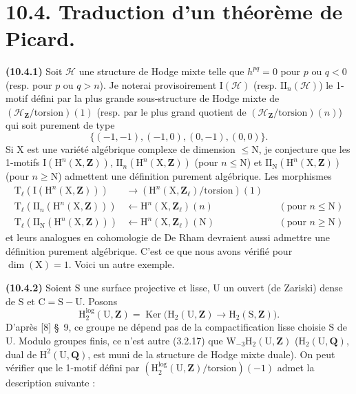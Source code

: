 \documentclass[11pt,leqno]{article}
\newcommand{\Page}[1]{\ifvmode\noindent\else\unskip\ \fi{\footnotesize\textcolor{gray}{[p.\,#1]}}\ \ignorespaces}
\begin{document}
\Page{75}
\section*{10.4. Traduction d’un théorème de Picard.}

\textbf{(10.4.1)} Soit \(\mathcal{H}\) une structure de Hodge mixte telle que \(h^{pq}=0\) pour \(p\) ou \(q<0\) (resp. pour \(p\) ou \(q>n\)). Je noterai provisoirement \(\mathrm{I}(\mathcal{H})\) (resp. \(\mathrm{II}_n(\mathcal{H})\)) le 1-motif défini par la plus grande sous-structure de Hodge mixte de \((\mathcal{H}_{\mathbf{Z}}/\mathrm{torsion})(1)\) (resp. par le plus grand quotient de \((\mathcal{H}_{\mathbf{Z}}/\mathrm{torsion})(n)\)) qui soit purement de type
\[
\{(-1,-1),(-1,0),(0,-1),(0,0)\}.
\]
Si \(\mathrm{X}\) est une variété algébrique complexe de dimension \(\leq\mathrm{N}\), je conjecture que les 1-motifs \(\mathrm{I}(\mathrm{H}^{n}(\mathrm{X},\mathbf{Z}))\), \(\mathrm{II}_n(\mathrm{H}^{n}(\mathrm{X},\mathbf{Z}))\) (pour \(n\leq\mathrm{N}\)) et \(\mathrm{II}_{\mathrm{N}}(\mathrm{H}^{n}(\mathrm{X},\mathbf{Z}))\) (pour \(n\geq\mathrm{N}\)) admettent une définition purement algébrique. Les morphismes
\[
\begin{aligned}
\mathrm{T}_{\ell}(\mathrm{I}(\mathrm{H}^{n}(\mathrm{X},\mathbf{Z})))
 &\longrightarrow
 (\mathrm{H}^{n}(\mathrm{X},\mathbf{Z}_{\ell})/\mathrm{torsion})(1)\\
\mathrm{T}_{\ell}(\mathrm{II}_n(\mathrm{H}^{n}(\mathrm{X},\mathbf{Z})))
 &\longleftarrow
 \mathrm{H}^{n}(\mathrm{X},\mathbf{Z}_{\ell})(n)
 &&(\text{pour }n\leq\mathrm{N})\\
\mathrm{T}_{\ell}(\mathrm{II}_{\mathrm{N}}(\mathrm{H}^{n}(\mathrm{X},\mathbf{Z})))
 &\longleftarrow
 \mathrm{H}^{n}(\mathrm{X},\mathbf{Z}_{\ell})(\mathrm{N})
 &&(\text{pour }n\geq\mathrm{N})
\end{aligned}
\]
et leurs analogues en cohomologie de De Rham devraient aussi admettre une définition purement algébrique. C’est ce que nous avons vérifié pour \(\dim(\mathrm{X})=1\). Voici un autre exemple.

\textbf{(10.4.2)} Soient \(\mathrm{S}\) une surface projective et lisse, \(\mathrm{U}\) un ouvert (de Zariski) dense de \(\mathrm{S}\) et \(\mathrm{C}=\mathrm{S}-\mathrm{U}\). Posons
\[
\mathrm{H}^{\log}_{2}(\mathrm{U},\mathbf{Z})
=\operatorname{Ker}\bigl(
\mathrm{H}_{2}(\mathrm{U},\mathbf{Z})
\to\mathrm{H}_{2}(\mathrm{S},\mathbf{Z})\bigr).
\]
D’après [8] \S~9, ce groupe ne dépend pas de la compactification lisse choisie \(\mathrm{S}\) de \(\mathrm{U}\). Modulo groupes finis, ce n’est autre (3.2.17) que \(\mathrm{W}_{-3}\mathrm{H}_{2}(\mathrm{U},\mathbf{Z})\) (\(\mathrm{H}_{2}(\mathrm{U},\mathbf{Q})\), dual de \(\mathrm{H}^{2}(\mathrm{U},\mathbf{Q})\), est muni de la structure de Hodge mixte duale). On peut vérifier que le 1-motif défini par \((\mathrm{H}^{\log}_{2}(\mathrm{U},\mathbf{Z})/\mathrm{torsion})(-1)\) admet la description suivante :
\end{document}
